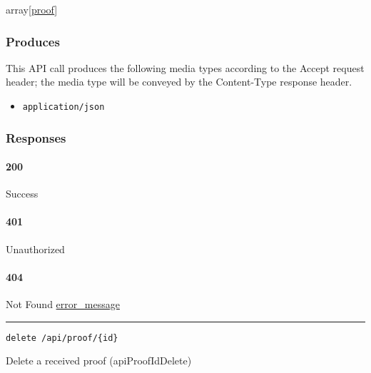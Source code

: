 array{[}\protect\hyperlink{proof}{proof}{]}

\hypertarget{produces-94}{%
\subsubsection{Produces}\label{produces-94}}

This API call produces the following media types according to the
{Accept} request header; the media type will be conveyed by the
{Content-Type} response header.

\begin{itemize}
\tightlist
\item
  \texttt{application/json}
\end{itemize}

\hypertarget{responses-96}{%
\subsubsection{Responses}\label{responses-96}}

\hypertarget{section-315}{%
\paragraph{200}\label{section-315}}

Success

\hypertarget{section-316}{%
\paragraph{401}\label{section-316}}

Unauthorized \protect\hyperlink{}{}

\hypertarget{section-317}{%
\paragraph{404}\label{section-317}}

Not Found \protect\hyperlink{error_message}{error\_message}

\begin{center}\rule{0.5\linewidth}{\linethickness}\end{center}

\protect\hypertarget{apiProofIdDelete}{}{}

\begin{verbatim}
delete /api/proof/{id}
\end{verbatim}

Delete a received proof ({apiProofIdDelete})

